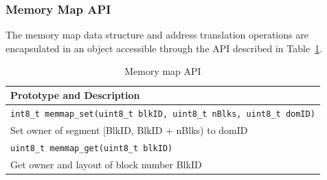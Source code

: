 \subsubsection{Memory Map API}
%
The memory map data structure and address translation operations are
encapsulated in an object accessible through the API described
in Table~\ref{tab:memmap_api}. 	
%
%
%
%
%
\begin{table}[htdp]
   \centering
   \small{
   \begin{tabular}{|l|}
   \hline
   Prototype and Description \\
   \hline
   \texttt{int8\_t memmap\_set(uint8\_t blkID, uint8\_t nBlks, uint8\_t
   domID)}\\
   Set owner of segment [BlkID, BlkID + nBlks) to domID \\
   \hline
   \texttt{uint8\_t memmap\_get(uint8\_t blkID)}\\
   Get owner and layout of block number BlkID \\
   \hline
   \end{tabular}
   }
   \centering
   \caption{Memory map API}
   \label{tab:memmap_api}
\end{table}
%
%
